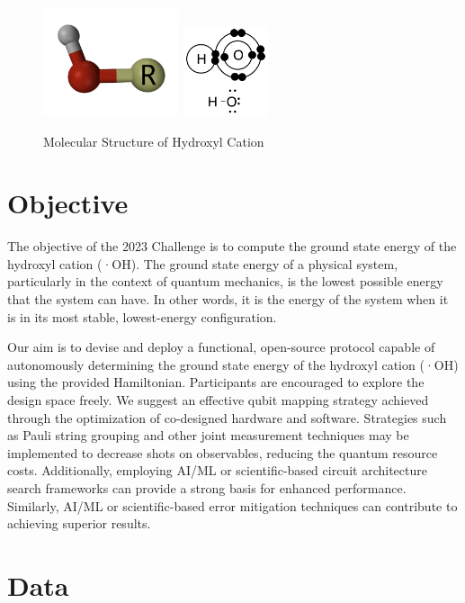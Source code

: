 \documentclass{article}
\begin{document}
\begin{figure}[h]
\centering
\includegraphics[width=4cm]{Images/Hydroxyl3D.png}
\includegraphics[width=2.5cm]{Images/Hydroxyl-OH.png}
\caption{Molecular Structure of Hydroxyl Cation}
\label{fig:molecularOH}
\end{figure}

\section{Objective}

The objective of the 2023 Challenge is to compute the ground state energy of the hydroxyl cation (·OH). The ground state energy of a physical system, particularly in the context of quantum mechanics, is the lowest possible energy that the system can have. In other words, it is the energy of the system when it is in its most stable, lowest-energy configuration.

Our aim is to devise and deploy a functional, open-source protocol capable of autonomously determining the ground state energy of the hydroxyl cation (·OH) using the provided Hamiltonian. Participants are encouraged to explore the design space freely. We suggest an effective qubit mapping strategy achieved through the optimization of co-designed hardware and software. Strategies such as Pauli string grouping and other joint measurement techniques may be implemented to decrease shots on observables, reducing the quantum resource costs. Additionally, employing AI/ML or scientific-based circuit architecture search frameworks can provide a strong basis for enhanced performance. Similarly, AI/ML or scientific-based error mitigation techniques can contribute to achieving superior results.

\section{Data}
\end{document}
